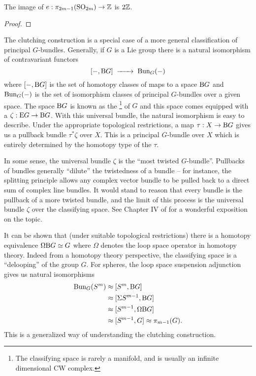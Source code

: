 \begin{corollary}\label{cor:expressible-euler-numbers-spheres}
	The image of $e : \pi_{2m-1}(\mathrm{SO}_{2m})\to\mathbb{Z}$ is $2\mathbb{Z}$.
\end{corollary}
\begin{proof}
\end{proof}

\begin{remark}
	The clutching construction is a special case of a more general classification of principal $G$-bundles. Generally, if $G$ is a Lie group there is a natural isomorphism of contravariant functors
	\[
		[-, \BB G] \lkxto \Bun_G(-)
	\]
	where $[-, \mathrm{B} G]$ is the set of homotopy classes of maps to a space $\mathrm{B} G$ and $\operatorname{Bun}_G(-)$ is the set of isomorphism classes of principal $G$-bundles over a given space.
	The space $\mathrm{B} G$ is known as the \footnote{The classifying space is rarely a manifold, and is usually an infinite dimensional CW complex.} of $G$ and this space comes equipped with a  $\zeta : \mathrm{E} G \to \mathrm{B} G$. With this universal bundle, the natural isomorphism is easy to describe. Under the appropriate topological restrictions, a map $\tau : X \to \mathrm{B} G$ gives us a pullback bundle $\tau^*\zeta$ over $X$. This is a principal $G$-bundle over $X$ which is entirely determined by the homotopy type of the  $\tau$.

	In some sense, the universal bundle $\zeta$ is the ``most twisted $G$-bundle''. Pullbacks of bundles generally ``dilute'' the twistedness of a bundle -- for instance, the splitting principle allows any complex vector bundle to be pulled back to a direct sum of complex line bundles. It would stand to reason that every bundle is the pullback of a more twisted bundle, and the limit of this process is the universal bundle $\zeta$ over the classifying space. See Chapter IV of \cite{botttu1982differential} for a wonderful exposition on the topic.

	It can be shown that (under suitable topological restrictions) there is a homotopy equivalence $\Omega \mathrm{B} G \simeq G$ where $\Omega$ denotes the loop space operator in homotopy theory. Indeed from a homotopy theory perspective, the classifying space is a ``delooping'' of the group $G$. For spheres, the loop space suspension adjunction gives us natural isomorphisms
	\[
		\begin{aligned}
			\operatorname{Bun}_{G}(S^m) & \approx [S^m, \mathrm{B} G]            \\
			              & \approx [\Sigma S^{m-1}, \mathrm{B} G] \\
			              & \approx [S^{m-1}, \Omega\mathrm{B} G]  \\
			              & \approx [S^{m-1}, G]
			\approx \pi_{m-1}(G).
		\end{aligned}
	\]
	This is a generalized way of understanding the clutching construction.
\end{remark}
